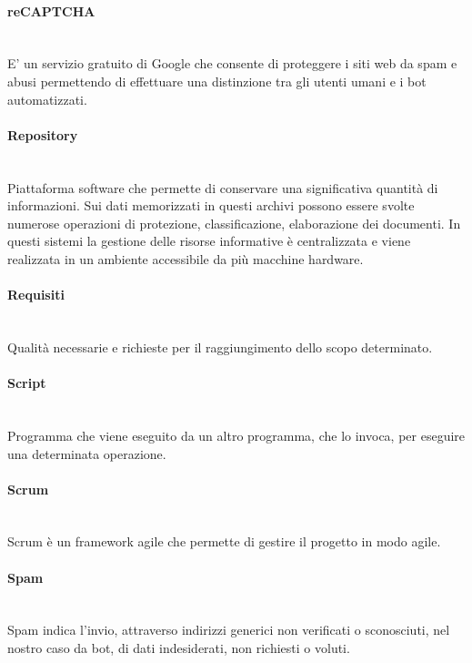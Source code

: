 \paragraph{reCAPTCHA}~\smallskip \\
E' un servizio gratuito di Google che consente di proteggere i siti web da spam e abusi permettendo di effettuare una distinzione tra gli utenti umani e i bot automatizzati.

\paragraph{Repository}~\smallskip \\
Piattaforma software che permette di conservare una significativa quantità di informazioni. Sui dati memorizzati in questi archivi possono essere svolte numerose operazioni di protezione, classificazione, elaborazione dei documenti. In questi sistemi la gestione delle risorse informative è centralizzata e viene realizzata in un ambiente accessibile da più macchine hardware.

\paragraph{Requisiti}~\smallskip \\
Qualità necessarie e richieste per il raggiungimento dello scopo determinato.

\paragraph{Script}~\smallskip \\
Programma che viene eseguito da un altro programma, che lo invoca, per eseguire una determinata operazione.

\paragraph{Scrum}~\smallskip \\
Scrum è un framework agile che permette di gestire il progetto in modo agile.

\paragraph{Spam}~\smallskip \\
Spam indica l'invio, attraverso indirizzi generici non verificati o sconosciuti, nel nostro caso da bot, di dati indesiderati, non richiesti o voluti.

